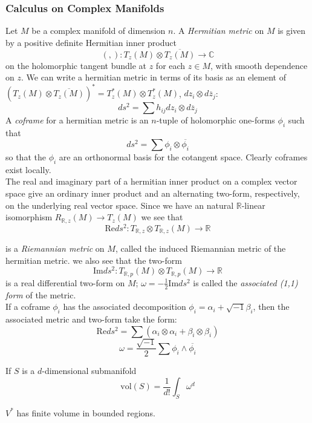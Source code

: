 \subsubsection{Calculus on Complex Manifolds}

\indent Let $M$ be a complex manifold of dimension $n$. A \textit{Hermitian metric} on $M$ is given by a positive definite Hermitian inner product
\[
	\left( , \right) :  T_z(M) \otimes \overline{T_z (M)} \to \mathbb{C} 
\]
on the holomorphic tangent bundle at $z$ for each $z \in M$, with smooth dependence on $z$. We can write a hermitian metric in terms of its basis as an element of $ \left( T_z(M) \otimes \overline{T_z(M)} \right)^* = T^*_z (M) \otimes T^*_z(M)$, $dz_i \otimes d\overline{z}_j$:
\[
	ds^2 = \sum h_{ij} dz_i \otimes d \overline{z}_j
\]
A \textit{coframe} for a hermitian metric is an $n$-tuple of holomorphic one-forms $\phi_i$ such that
\[
	ds^2 = \sum \phi_i \otimes \overline{\phi_i}
\]
so that the $\phi_i$ are an orthonormal basis for the cotangent space. Clearly coframes exist locally. \\
\indent The real and imaginary part of a hermitian inner product on a complex vector space give an ordinary inner product and an alternating two-form, respectively, on the underlying real vector space. Since we have an natural $ \mathbb{R}$-linear isomorphism $ R_{ \mathbb{R},z}(M) \to T_z (M)$ we see that
\[
	\mathrm{Re} ds^2: T_{ \mathbb{R},z} \otimes T_{ \mathbb{R},z}(M) \to \mathbb{R}
\]

is a \textit{Riemannian metric} on $M$, called the induced Riemannian metric of the hermitian metric. we also see that the two-form
\[
	\mathrm{Im}ds^2: T_{ \mathbb{R},p}(M) \otimes T_{ \mathbb{R},p}(M) \to \mathbb{R}
\]
is a real differential two-form on $M$; $\omega = - \frac{1}{2} \mathrm{Im}ds^2$ is called the \textit{associated (1,1) form} of the metric.\\
\indent If a coframe $\phi_i$ has the associated decomposition $\phi_i = \alpha_i + \sqrt{-1} \beta_i$, then the associated metric and two-form take the form:
\[
	\mathrm{Re}ds^2 = \sum ( \alpha_i \otimes \alpha_i + \beta_i \otimes \beta_i)
\]
\[
	\omega = \frac{\sqrt{-1}}{2}\sum \phi_i \wedge \overline{\phi_i}
\]


\begin{thm}
If $S$ is a $d$-dimensional submanifold
\[
	\mathrm{vol}(S) = \frac{1}{d!}\int_S \omega^d
\]
\end{thm}


\begin{prop}

	$V^*$ has finite volume in bounded regions.

\end{prop}


